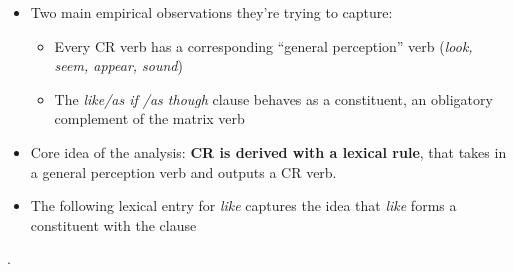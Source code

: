 \documentclass[11pt]{article}
\begin{document}
\begin{itemize}
  \item Two main empirical observations they're trying to capture: \begin{itemize}
      \item Every CR verb has a corresponding ``general perception'' verb (\textit{look, seem, appear, sound})
      \item The \textit{like\slash as if \slash as though} clause behaves as a constituent, an obligatory complement of the matrix verb
    \end{itemize}



  \item Core idea of the analysis: \textbf{CR is derived with a lexical rule}, that takes in a general perception verb and outputs a CR verb.

  \item The following lexical entry for \emph{like} captures the idea that \emph{like} forms a constituent with the clause
\end{itemize}
\ex. 
\end{document}

